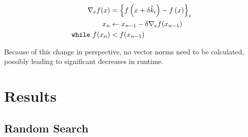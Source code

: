 \documentclass{article}
\begin{document}
            \begin{align}
                \label{eq:empirical_gradient} \nabla_e f(x) &= \left\{f\left(x + \delta \hat{k}_i\right) - f\left(x\right)\right\}_i \\
                \label{empirical_descent} x_{n} &\leftarrow x_{n-1} - \delta \nabla_e f(x_{n-1}) \\
                \label{eq:empirical_while} \text{\texttt{while} } f(x_{n}) &< f(x_{n-1})
            \end{align}

            Because of this change in perspective, no vector norms need to be calculated, possibly leading to significant decreases in runtime.

\pagebreak
    \section{Results}

        \subsection{Random Search}
\end{document}
